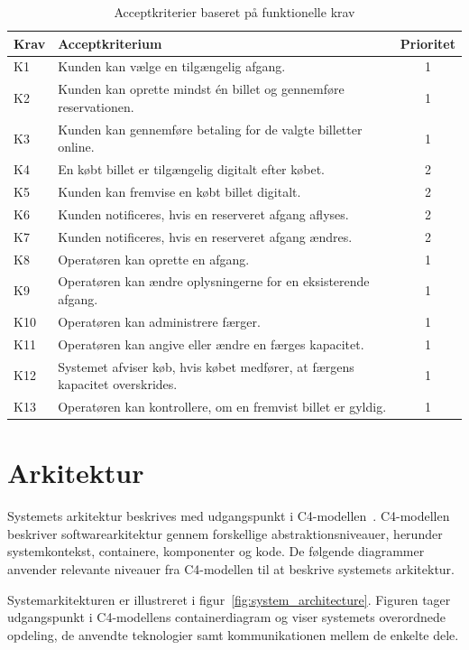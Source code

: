 \documentclass[a4paper, 11pt]{article}
\begin{document}
\begin{table}[ht]
\centering
\begin{tabular}{|l|p{9cm}|c|}
\hline
\textbf{Krav} & \textbf{Acceptkriterium} & \textbf{Prioritet} \\
\hline
K1 & Kunden kan vælge en tilgængelig afgang. & 1 \\
\hline
K2 & Kunden kan oprette mindst én billet og gennemføre reservationen. & 1 \\
\hline
K3 & Kunden kan gennemføre betaling for de valgte billetter online. & 1 \\
\hline
K4 & En købt billet er tilgængelig digitalt efter købet. & 2 \\
\hline
K5 & Kunden kan fremvise en købt billet digitalt. & 2 \\
\hline
K6 & Kunden notificeres, hvis en reserveret afgang aflyses. & 2 \\
\hline
K7 & Kunden notificeres, hvis en reserveret afgang ændres. & 2 \\
\hline
K8 & Operatøren kan oprette en afgang. & 1 \\
\hline
K9 & Operatøren kan ændre oplysningerne for en eksisterende afgang. & 1 \\
\hline
K10 & Operatøren kan administrere færger. & 1 \\
\hline
K11 & Operatøren kan angive eller ændre en færges kapacitet. & 1 \\
\hline
K12 & Systemet afviser køb, hvis købet medfører, at færgens kapacitet overskrides. & 1 \\
\hline
K13 & Operatøren kan kontrollere, om en fremvist billet er gyldig. & 1 \\
\hline
\end{tabular}
\caption{Acceptkriterier baseret på funktionelle krav}
\label{tab:acceptkriterier}
\end{table}

\newpage

\section{Arkitektur}

Systemets arkitektur beskrives med udgangspunkt i C4-modellen~\cite{c4_model}. C4-modellen
beskriver softwarearkitektur gennem forskellige abstraktionsniveauer, herunder systemkontekst,
containere, komponenter og kode. De følgende diagrammer anvender relevante niveauer fra
C4-modellen til at beskrive systemets arkitektur.

Systemarkitekturen er illustreret i figur~\ref{fig:system_architecture}. Figuren tager
udgangspunkt i C4-modellens containerdiagram og viser systemets overordnede opdeling, de
anvendte teknologier samt kommunikationen mellem de enkelte dele.
\end{document}
